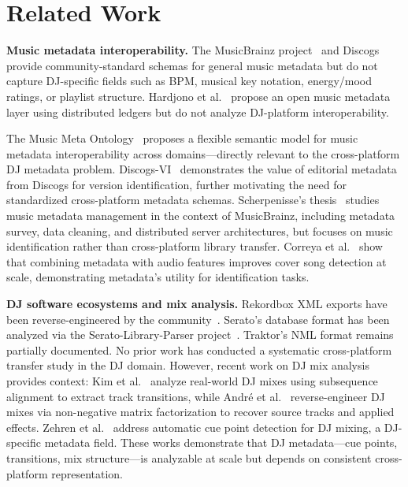 

\section{Related Work}

\textbf{Music metadata interoperability.} The MusicBrainz project~\citep{musicbrainz} and Discogs~\citep{discogs} provide community-standard schemas for general music metadata but do not capture DJ-specific fields such as BPM, musical key notation, energy/mood ratings, or playlist structure. Hardjono et al.~\citep{hardjono2019} propose an open music metadata layer using distributed ledgers but do not analyze DJ-platform interoperability.

The Music Meta Ontology~\citep{deberardinis2023metontology} proposes a flexible semantic model for music metadata interoperability across domains---directly relevant to the cross-platform DJ metadata problem. Discogs-VI~\citep{araz2024discogsvi} demonstrates the value of editorial metadata from Discogs for version identification, further motivating the need for standardized cross-platform metadata schemas. Scherpenisse's thesis~\citep{scherpenisse2004} studies music metadata management in the context of MusicBrainz, including metadata survey, data cleaning, and distributed server architectures, but focuses on music identification rather than cross-platform library transfer. Correya et al.~\citep{correya2018coversong} show that combining metadata with audio features improves cover song detection at scale, demonstrating metadata's utility for identification tasks.

\textbf{DJ software ecosystems and mix analysis.} Rekordbox XML exports have been reverse-engineered by the community~\citep{pyrekordbox}. Serato's database format has been analyzed via the Serato-Library-Parser project~\citep{serato-parser}. Traktor's NML format remains partially documented. No prior work has conducted a systematic cross-platform transfer study in the DJ domain. However, recent work on DJ mix analysis provides context: Kim et al.~\citep{kim2020djmixes} analyze real-world DJ mixes using subsequence alignment to extract track transitions, while Andr{\'e} et al.~\citep{andre2024djmix} reverse-engineer DJ mixes via non-negative matrix factorization to recover source tracks and applied effects. Zehren et al.~\citep{zehren2020cuepoints} address automatic cue point detection for DJ mixing, a DJ-specific metadata field. These works demonstrate that DJ metadata---cue points, transitions, mix structure---is analyzable at scale but depends on consistent cross-platform representation.

